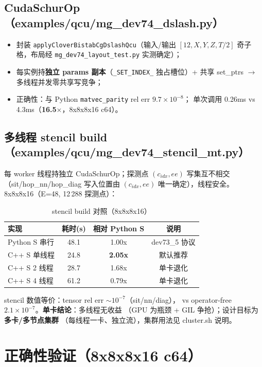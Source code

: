 \documentclass[11pt,a4paper]{article}
\begin{document}
\subsection{CudaSchurOp（examples/qcu/mg\_dev74\_dslash.py）}

\begin{itemize}
  \item 封装 \texttt{applyCloverBistabCgDslashQcu}（输入/输出
    $[12,X,Y,Z,T/2]$ 奇子格，布局经 \texttt{mg\_dev74\_layout\_test.py} 实测确定）；
  \item 每实例持\textbf{独立 params 副本}（\texttt{\_SET\_INDEX\_} 独占槽位）+
    共享 set\_ptrs $\to$ 多线程并发零共享写竞争；
  \item 正确性：与 Python \texttt{matvec\_parity} rel err $9.7\times10^{-8}$；
    单次调用 0.26ms vs 4.3ms（\textbf{16.5$\times$}，8x8x8x16 c64）。
\end{itemize}

\subsection{多线程 stencil build（examples/qcu/mg\_dev74\_stencil\_mt.py）}

每 worker 线程持独立 CudaSchurOp；探测点 $(c_{idx},ee)$ 写集互不相交
（sit/hop\_nn/hop\_diag 写入位置由 $(c_{idx},ee)$ 唯一确定），线程安全。
8x8x8x16（E=48, 12\,288 探测点）：

\begin{table}[H]
  \centering
  \begin{tabular}{lccc}
    \hline
    实现 & 耗时(s) & 相对 Python S & 说明 \\
    \hline
    Python S 串行 & 48.1 & 1.00x & dev73\_5 协议 \\
    C++ S 单线程 & 24.8 & \textbf{2.05x} & 默认推荐 \\
    C++ S 2 线程 & 28.7 & 1.68x & 单卡退化 \\
    C++ S 4 线程 & 61.2 & 0.79x & 单卡退化 \\
    \hline
  \end{tabular}
  \caption{stencil build 对照（8x8x8x16）}
\end{table}

stencil 数值等价：tensor rel err $\sim10^{-7}$（sit/nn/diag），
vs operator-free $2.1\times10^{-7}$。\textbf{单卡结论}：多线程无收益
（GPU 为瓶颈 + GIL 争抢）；设计目标为\textbf{多卡/多节点集群}
（每线程一卡、独立流），集群用法见 cluster.sh 说明。

\section{正确性验证（8x8x8x16 c64）}
\label{sec:verify}
\end{document}
